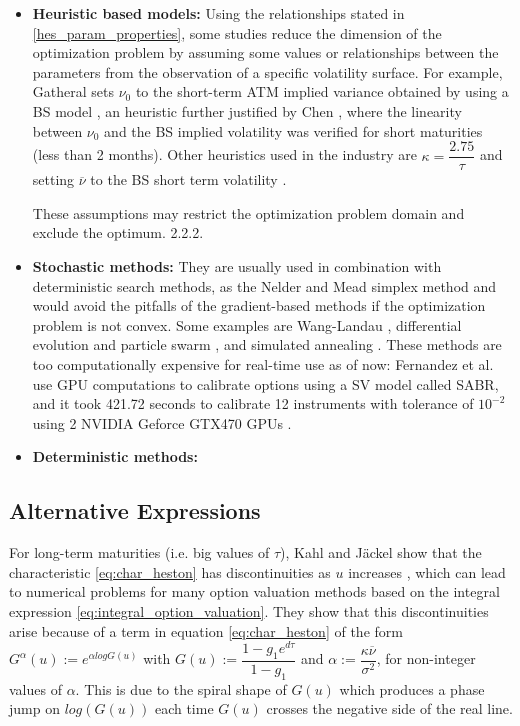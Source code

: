 \documentclass[12,twoside]{mammeTFM}
\theoremstyle{definition}
\theoremstyle{remark}
\newcommand{\vega}{\nu}
\begin{document}
\begin{itemize}
\item{\textbf{Heuristic based models:}}
Using the relationships stated in \ref{hes_param_properties}, some studies reduce the dimension of the optimization problem by assuming some values or relationships between the parameters from the observation of a specific volatility surface. For example, Gatheral sets $\nu_0$ to the short-term ATM implied variance obtained by using a BS model \cite{gat06}, an heuristic further justified by Chen \cite{che07}, where the linearity between $\nu_0$ and the BS implied volatility was verified for short maturities (less than 2 months). Other heuristics used in the industry are $\kappa = \dfrac{2.75}{\tau}$ and setting $\overline{\nu}$ to the BS short term volatility \cite{cla11}.

These assumptions may restrict the optimization problem domain and exclude the optimum.
2.2.2.
\item{\textbf{Stochastic methods:}}
They are usually used in combination with deterministic search methods, as the Nelder and Mead simplex method \cite{lag98} and would avoid the pitfalls of the gradient-based methods if the optimization problem is not convex. Some examples are Wang-Landau \cite{che07}, differential evolution and particle swarm \cite{gil12_2}, and simulated annealing \cite{moo09}.
These methods are too computationally expensive for real-time use as of now: Fernandez et al. use GPU computations to calibrate options using a SV model called SABR, and it took 421.72 seconds to calibrate 12 instruments with tolerance of $10^{-2}$ using 2 NVIDIA Geforce GTX470 GPUs \cite{fer13}.

\item{\textbf{Deterministic methods:}}

\end{itemize}

\subsection{Alternative Expressions}

For long-term maturities (i.e. big values of $\tau$), Kahl and J\"{a}ckel show that the characteristic  \ref{eq:char_heston} has discontinuities as $u$ increases \cite{kah06}, which can lead to numerical problems for many option valuation methods based on the integral expression \ref{eq:integral_option_valuation}. They show that this discontinuities arise because of a term in equation \ref{eq:char_heston} of the form $G^\alpha(u) := e^{\alpha log G(u)}$ with $G(u) := \dfrac{1 - g_1 e^{d\tau}}{1 - g_1}$ and $\alpha := \dfrac{\kappa \overline{\vega}}{\sigma^2}$, for non-integer values of $\alpha$. This is due to the spiral shape of $G(u)$ which produces a phase jump on $log(G(u))$ each time $G(u)$ crosses the negative side of the real line.
\end{document}
